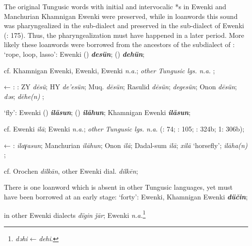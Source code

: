 \documentclass[output=paper,colorlinks,citecolor=brown]{langscibook}
\begin{document}
\z
\z
\ea
The original Tungusic words with initial and intervocalic *s in  Ewenki and Manchurian Khamnigan Ewenki were preserved, while in  loanwords this sound was pharyngealized in the  sub-dialect and preserved in the  sub-dialect of  Ewenki (\citealt{Khabtagaeva2017}: 175). Thus, the pharyngealization must have happened in a later period. More likely these loanwords were borrowed from the ancestors of the  subdialect of :
\ea ‘rope, loop, lasso’:  Ewenki () \textbf{\textit{desün}}; () \textbf{\textit{dehün}};

    cf. Khamnigan Ewenki,  Ewenki,  Ewenki \textit{n.a.}; \textit{other Tungusic lgs. n.a.} \citep[89]{Castrén1856};

    ← : : ZY \textit{dēsü}; HY \textit{de’esün}; Muq. \textit{dēsün}; Rasulid \textit{dēsün};  \textit{degesün}; Onon  \textit{dēsün};  \textit{dǝs};  \textit{dēhe(n)} \citep[80]{Khabtagaeva2017}; 

    \ex ‘fly’:  Ewenki () \textbf{\textit{ilāsun}}; () \textbf{\textit{ilāhun}}; Khamnigan Ewenki \textbf{\textit{ilāsun}};

    cf.  Ewenki \textit{ilā};  Ewenki \textit{n.a.}; \textit{other Tungusic lgs.} \textit{n.a}. (\citealt{Castrén1856}: 74; \citealt{Janhunen1991}: 105; \citealt{Dorji1998}: 324b; \citealt{Cincius1975B} 1: 306b);

    ← :  \textit{ilaγasun}; Manchurian  \textit{ilāhun}; Onon  \textit{ilā}; Dadal-sum  \textit{ilā};  \textit{xilā} ‘horsefly’;  \textit{ilāha(n)} \citep[90]{Khabtagaeva2017};

    cf. Orochen \textit{dilkān}, other Ewenki dial. \textit{dilkēn};

\z
\z
\ea
There is one  loanword which is absent in other Tungusic languages, yet must have been borrowed at an early stage:
\ea ‘forty’:  Ewenki, Khamnigan Ewenki \textbf{\textit{düčin}};

    in other Ewenki dialects \textit{dïgin ǰār};  Ewenki \textit{n.a.}\footnote{ \textit{dǝhi} \citep[346]{Chaoke2014bB} ←  \textit{dehi}.}
    
\end{document}
